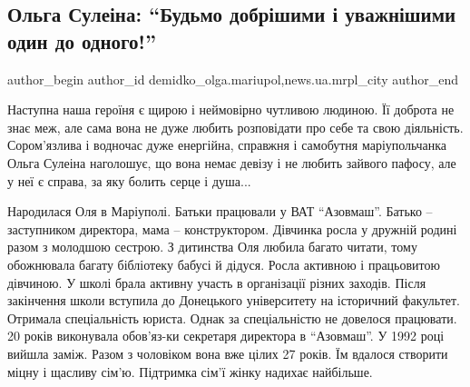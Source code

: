  
 
 
 
 
 
\subsection{Ольга Сулеіна: \enquote{Будьмо добрішими і уважнішими один до одного!}}
\label{sec:06_12_2019.stz.news.ua.mrpl_city.1.olga_suleina_budjmo_dobrishymy}
 
\ifcmt
 author_begin
   author_id demidko_olga.mariupol,news.ua.mrpl_city
 author_end
\fi

Наступна наша героїня є щирою і неймовірно чутливою людиною. Її доброта не знає
меж, але сама вона не дуже любить розповідати про себе та свою діяльність.
Сором'язлива і водночас дуже енергійна, справжня і самобутня маріупольчанка
Ольга Сулеіна наголошує, що вона немає девізу і  не любить зайвого пафосу, але
у неї є справа, за яку болить серце і душа...


Народилася Оля в Маріуполі. Батьки працювали у ВАТ \enquote{Азовмаш}. Батько –
заступником директора, мама – конструктором. Дівчинка росла у дружній родині
разом з молодшою сестрою. З дитинства Оля любила багато читати, тому обожнювала
багату бібліотеку бабусі й дідуся. Росла активною і працьовитою дівчиною. У
школі брала активну участь в організації різних заходів. Після закінчення школи
вступила до Донецького університету на історичний факультет. Отримала
спеціальність юриста. Однак за спеціальністю не довелося працювати. 20 років
виконувала обов'яз\hyp{}ки секретаря директора в \enquote{Азовмаш}. У 1992 році вийшла
заміж. Разом з чоловіком вона вже цілих 27 років. Їм вдалося створити міцну і
щасливу сім'ю. Підтримка сім'ї жінку надихає найбільше.


